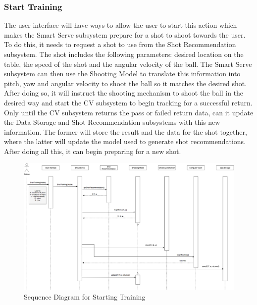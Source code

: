 \documentclass[11pt]{article}
\begin{document}
\subsubsection{Start Training}
The user interface will have ways to allow the user to start this action which makes the Smart Serve subsystem prepare for a shot to shoot towards the user. To do this, it needs to request a shot to use from the Shot Recommendation subsystem. The shot includes the following parameters: desired location on the table, the speed of the shot and the angular velocity of the ball. The Smart Serve subsystem can then use the Shooting Model to translate this information into pitch, yaw and angular velocity to shoot the ball so it matches the desired shot. After doing so, it will instruct the shooting mechanism to shoot the ball in the desired way and start the CV subsystem to begin tracking for a successful return. Only until the CV subsystem returns the pass or failed return data, can it update the Data Storage and Shot Recommendation subsystems with this new information. The former will store the result and the data for the shot together, where the latter will update the model used to generate shot recommendations. After doing all this, it can begin preparing for a new shot.
\begin{figure}[H]
   \centering
   \includegraphics[width=\textwidth]{img/SequenceDiagram-Start.png}
   \caption{Sequence Diagram for Starting Training}
   \label{fig:start}
\end{figure}
\end{document}
